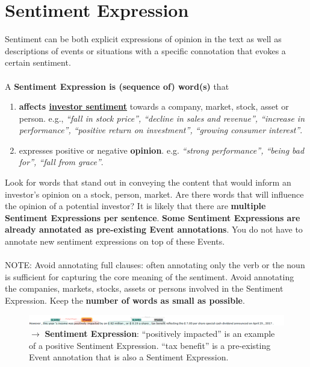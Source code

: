 
\section{Sentiment Expression}
\label{sec:sentimentexpressiondefinition}
Sentiment can be both explicit expressions of opinion in the text as well as descriptions of events or situations with a specific connotation that evokes a certain sentiment.
\\\\
\noindent
A \textbf{Sentiment Expression is (sequence of) word(s)} that
\begin{enumerate}[label=\alph*), leftmargin=*]
    \item \textbf{affects \hyperref[sec:sentimentdef]{investor sentiment}} towards a company, market, stock, asset or person. e.g., \textit{``fall in stock price'', ``decline in sales and revenue'', ``increase in performance'', ``positive return on investment'', ``growing consumer interest''}.
    \item expresses positive or negative \textbf{opinion}. e.g. \textit{``strong performance'', ``being bad for'', ``fall from grace''}.
\end{enumerate}
\noindent
Look for words that stand out in conveying the content that would inform an investor’s opinion on a stock, person, market. Are there words that will influence the opinion of a potential investor?
It is likely that there are \textbf{multiple Sentiment Expressions per sentence}.
\textbf{Some Sentiment Expressions are already annotated as pre-existing Event annotations}.
You do not have to annotate new sentiment expressions on top of these Events.\\\\
\noindent
\textcolor{BrickRed}{NOTE: Avoid annotating full clauses: often annotating only the verb or the noun is sufficient for capturing the core meaning of the sentiment. Avoid annotating the companies, markets, stocks, assets or persons involved in the Sentiment Expression. Keep the \textbf{number of words as small as possible}.}

\begin{figure}[h]
    \centering
    \includegraphics[width=\textwidth]{img/cost03s11 general example.png}
    \caption*{$\rightarrow$ \textbf{Sentiment Expression}: ``positively impacted'' is an example of a positive Sentiment Expression. ``tax benefit'' is a pre-existing Event annotation that is also a Sentiment Expression.}
    \label{fig:se_ex1}
\end{figure}

